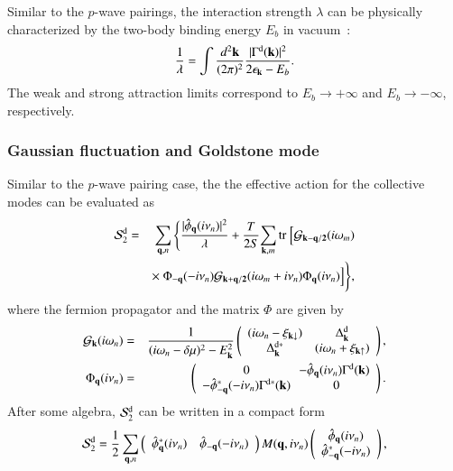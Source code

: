 \documentclass[aps,prd,amsmath,two column,nofootinbib,amssymb,referee]{revtex4}
\begin{document}
Similar to the $p$-wave pairings, the interaction strength $\lambda$ can be physically characterized
by the two-body binding energy $E_b$ in vacuum~\cite{Botelho2005a}:
\begin{eqnarray}
{1\over\lambda}=\int{d^2{\bf k}\over(2\pi)^2}{|\Gamma^{\rm d}({\bf k})|^2\over2\epsilon_{{\bf k}}-E_b}.
\end{eqnarray}
The weak and strong attraction limits correspond to
$E_b\rightarrow+\infty$ and $E_b\rightarrow-\infty$, respectively.

\subsubsection{Gaussian fluctuation and Goldstone mode}\label{sectiond2}
Similar to the $p$-wave pairing case, the the effective action for the collective modes can be evaluated as
\begin{eqnarray}
{\cal S}_2^{\rm d}&=&\sum_{{\bf q},n}\Bigg\{{|\hat\phi_{\bf q}(i\nu_n)|^2\over\lambda}+{T\over2S}\!\sum_{{\bf k},m}{\rm tr}~\Big[{\cal G}_{\bf k-q/2}(i\omega_m) \nonumber\\
&&\times~\Phi_{\bf -q}(-i\nu_n){\cal G}_{\bf k+q/2}(i\omega_m+i\nu_n)\Phi_{\bf q}(i\nu_n)\Big]\Bigg\},
\end{eqnarray}
where the fermion propagator and the matrix $\Phi$ are given by
\begin{eqnarray}
{\cal G}_{\bf k}(i\omega_n)&=&{1\over(i\omega_n-\delta\mu)^2-E_{{\bf k}}^2}\left(\begin{array}{cc}
(i\omega_n-\xi_{{\bf k}\downarrow})&\Delta_{\bf k}^{\rm d}\\
\Delta_{\bf k}^{\rm d*}&(i\omega_n+\xi_{{\bf k}\uparrow})
\end{array}\right),\nonumber\\
\Phi_{\bf q}(i\nu_n)&=&\left(\begin{array}{cc}
0&\!\!-\hat\phi_{\bf q}(i\nu_n)\Gamma^{\rm d}({\bf k})\\
-\hat\phi_{\bf -q}^*(-i\nu_n)\Gamma^{\rm d*}({\bf k})&0
\end{array}\right).
\end{eqnarray}
After some algebra, ${\cal S}_2^{\rm d}$ can be written in a compact form 
\begin{eqnarray}
{\cal S}_2^{\rm d}=\frac{1}{2}\sum_{{\bf q},n}\left(\begin{array}{cc}
\hat{\phi}_{\bf q}^*(i\nu_n) & \hat{\phi}_{-{\bf q}}(-i\nu_n)\end{array}\right) M({\bf q},i\nu_n)\left(\begin{array}{cc} \hat{\phi}_{\bf q}(i\nu_n)\\
\hat{\phi}_{-{\bf q}}^*(-i\nu_n)\end{array}\right),
\end{eqnarray}
\end{document}
